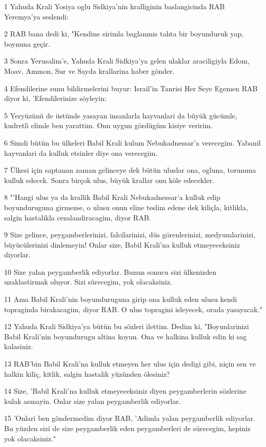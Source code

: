 \par 1 Yahuda Krali Yosiya oglu Sidkiya'nin kralliginin baslangicinda RAB Yeremya'ya seslendi:
\par 2 RAB bana dedi ki, "Kendine sirimla baglanmis tahta bir boyunduruk yap, boynuna geçir.
\par 3 Sonra Yerusalim'e, Yahuda Krali Sidkiya'ya gelen ulaklar araciligiyla Edom, Moav, Ammon, Sur ve Sayda krallarina haber gönder.
\par 4 Efendilerine sunu bildirmelerini buyur: Israil'in Tanrisi Her Seye Egemen RAB diyor ki, 'Efendilerinize söyleyin:
\par 5 Yeryüzünü de üstünde yasayan insanlarla hayvanlari da büyük gücümle, kudretli elimle ben yarattim. Onu uygun gördügüm kisiye veririm.
\par 6 Simdi bütün bu ülkeleri Babil Krali kulum Nebukadnessar'a verecegim. Yabanil hayvanlari da kulluk etsinler diye ona verecegim.
\par 7 Ülkesi için saptanan zaman gelinceye dek bütün uluslar ona, ogluna, torununa kulluk edecek. Sonra birçok ulus, büyük krallar onu köle edecekler.
\par 8 "'Hangi ulus ya da krallik Babil Krali Nebukadnessar'a kulluk edip boyunduruguna girmezse, o ulusu onun eline teslim edene dek kiliçla, kitlikla, salgin hastalikla cezalandiracagim, diyor RAB.
\par 9 Size gelince, peygamberlerinizi, falcilarinizi, düs görenlerinizi, medyumlarinizi, büyücülerinizi dinlemeyin! Onlar size, Babil Krali'na kulluk etmeyeceksiniz diyorlar.
\par 10 Size yalan peygamberlik ediyorlar. Bunun sonucu sizi ülkenizden uzaklastirmak oluyor. Sizi sürecegim, yok olacaksiniz.
\par 11 Ama Babil Krali'nin boyunduruguna girip ona kulluk eden ulusu kendi topraginda birakacagim, diyor RAB. O ulus topragini isleyecek, orada yasayacak."
\par 12 Yahuda Krali Sidkiya'ya bütün bu sözleri ilettim. Dedim ki, "Boyunlarinizi Babil Krali'nin boyundurugu altina koyun. Ona ve halkina kulluk edin ki sag kalasiniz.
\par 13 RAB'bin Babil Krali'na kulluk etmeyen her ulus için dedigi gibi, niçin sen ve halkin kiliç, kitlik, salgin hastalik yüzünden ölesiniz?
\par 14 Size, 'Babil Krali'na kulluk etmeyeceksiniz diyen peygamberlerin sözlerine kulak asmayin. Onlar size yalan peygamberlik ediyorlar.
\par 15 'Onlari ben göndermedim diyor RAB, 'Adimla yalan peygamberlik ediyorlar. Bu yüzden sizi de size peygamberlik eden peygamberleri de sürecegim, hepiniz yok olacaksiniz."
